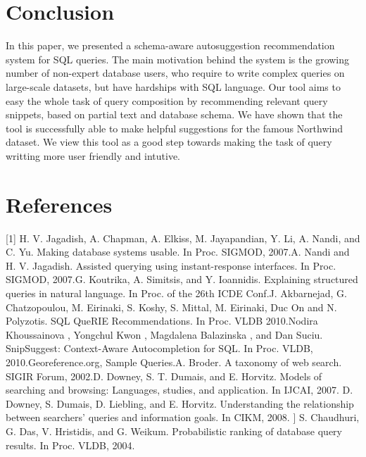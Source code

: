 \documentclass{acm_proc_article-sp}
\begin{document}
\section{Conclusion}
In this paper, we presented a schema-aware autosuggestion recommendation system for SQL queries. The main motivation behind the system is the growing number of non-expert database users, who require to write complex queries on large-scale datasets, but have hardships with SQL language. Our tool aims to easy the whole task of query composition by recommending relevant query snippets, based on partial text and database schema. We have shown that the tool is successfully able to make helpful suggestions for the famous Northwind dataset. We view this tool as a good step towards making the task of query writting more user friendly and intutive.

\section{References}
[1] H. V. Jagadish, A. Chapman, A. Elkiss, M. Jayapandian, Y. Li, A. Nandi, and C. Yu. Making database systems usable. In Proc. SIGMOD, 2007.\newline
[2] A. Nandi and H. V. Jagadish. Assisted querying using instant-response interfaces. In Proc. SIGMOD, 2007.\newline
[3] G. Koutrika, A. Simitsis, and Y. Ioannidis. Explaining structured queries in natural language. In Proc. of the 26th ICDE Conf.\newline
[4] J. Akbarnejad, G. Chatzopoulou, M. Eirinaki, S. Koshy, S. Mittal, M. Eirinaki, Duc On and N. Polyzotis. SQL QueRIE Recommendations. In Proc. VLDB 2010.\newline
[5] Nodira Khoussainova , Yongchul Kwon , Magdalena Balazinska , and Dan Suciu. SnipSuggest: Context-Aware Autocompletion for SQL. In Proc. VLDB, 2010.\newline
[6] Georeference.org, Sample Queries.\newline
[7] A. Broder. A taxonomy of web search. SIGIR Forum, 2002.\newline
[8] D. Downey, S. T. Dumais, and E. Horvitz. Models of searching and browsing: Languages, studies, and application. In IJCAI, 2007. \newline
[9] D. Downey, S. Dumais, D. Liebling, and E. Horvitz. Understanding the relationship between searchers’ queries and information goals. In CIKM, 2008. \newline
[10] ] S. Chaudhuri, G. Das, V. Hristidis, and G. Weikum. Probabilistic ranking of database query results. In Proc. VLDB, 2004.
\end{document}
